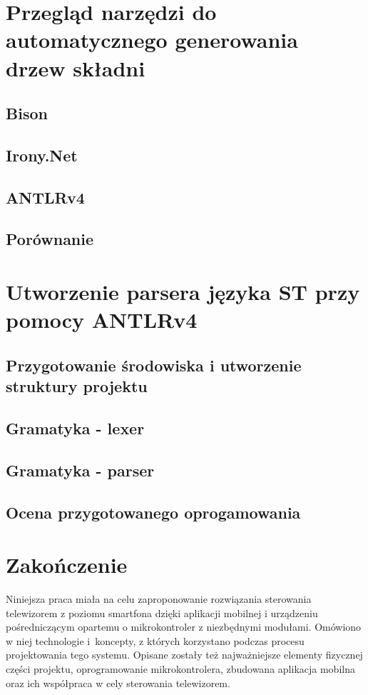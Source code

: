 \documentclass[12pt,twoside]{article}
\begin{document}
\section{Przegląd narzędzi do automatycznego generowania drzew składni}
\subsection{Bison}

\subsection{Irony.Net}
\subsection{ANTLRv4}
\subsection{Porównanie}
\clearpage
\section{Utworzenie parsera języka ST przy pomocy ANTLRv4}
\subsection{Przygotowanie środowiska i utworzenie struktury projektu}
\subsection{Gramatyka - lexer}
\subsection{Gramatyka - parser}
\subsection{Ocena przygotowanego oprogamowania}
\clearpage

\section{Zakończenie}

Niniejsza praca miała na celu zaproponowanie rozwiązania sterowania telewizorem z poziomu smartfona dzięki aplikacji mobilnej i urządzeniu pośredniczącym opartemu o mikrokontroler z niezbędnymi modułami. Omówiono w niej technologie i~koncepty, z których korzystano podczas procesu projektowania tego systemu. Opisane zostały też najważniejsze elementy fizycznej części projektu, oprogramowanie mikrokontrolera, zbudowana aplikacja mobilna oraz ich współpraca w cely sterowania telewizorem.
\end{document}
